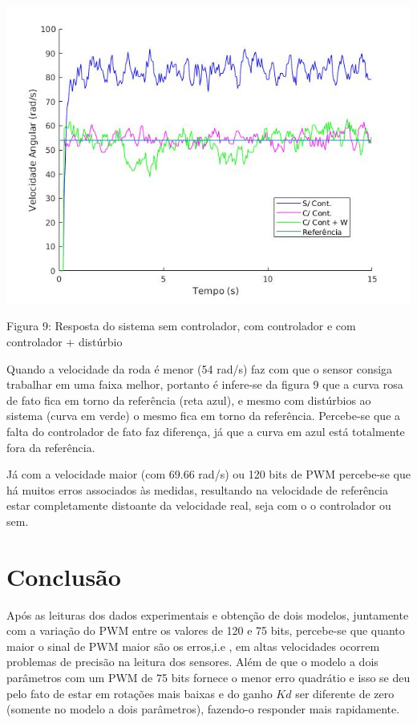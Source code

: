 \documentclass{article}
\begin{document}
\begin{center}
    \centering
        \includegraphics[scale=0.5]{imagens/pwm75.jpg}
        
        \caption{Figura 9: Resposta do sistema sem controlador, com controlador e com controlador + distúrbio }
\end{center}

Quando a velocidade da roda é menor (54 rad/s) faz com que o sensor consiga trabalhar em uma faixa melhor, portanto é infere-se da figura 9 que a curva rosa de fato fica em torno da referência (reta azul), e mesmo com distúrbios ao sistema (curva em verde) o mesmo fica em torno da referência. Percebe-se que a falta do controlador de fato faz diferença, já que a curva em azul está totalmente fora da referência.

Já com a velocidade maior (com 69.66 rad/s) ou 120 bits de PWM percebe-se que há muitos erros associados às medidas, resultando na velocidade de referência estar completamente distoante da velocidade real, seja com o o controlador ou sem.


\section{Conclusão}
Após as leituras dos dados experimentais e obtenção de dois modelos, juntamente com a variação do PWM entre os valores de 120 e 75 bits, percebe-se que quanto maior o sinal de PWM maior são os erros,i.e , em altas velocidades ocorrem problemas de precisão na leitura dos sensores. Além de que o modelo a dois parâmetros com um PWM de 75 bits fornece o menor erro quadrátio e isso se deu pelo fato de estar em rotações mais baixas e do ganho $Kd$ ser diferente de zero (somente no modelo a dois parâmetros), fazendo-o responder mais rapidamente.
\end{document}
